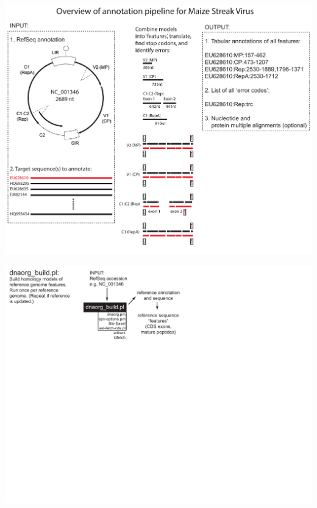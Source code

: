 \documentclass[landscape]{slides}
\begin{document}
\begin{slide}
\includegraphics[width=10in]{figs/annotation-schematic-4}
\vfill
\end{slide}
\begin{slide}
\includegraphics[width=10in]{figs/dnaorg-scripts-build1}
\vfill
\end{slide}
\end{document}
